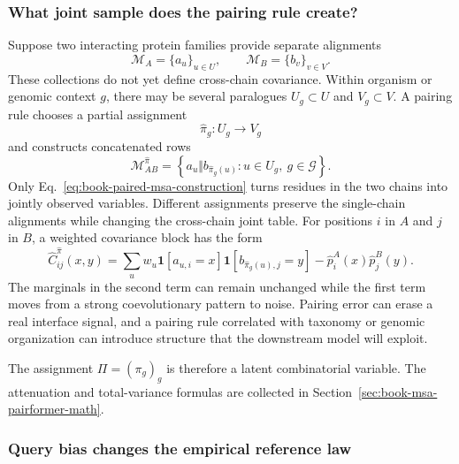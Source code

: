 \subsubsection{What joint sample does the pairing rule create?}

Suppose two interacting protein families provide separate alignments
\begin{equation}
\mathcal M_A=\{a_u\}_{u\in U},
\qquad
\mathcal M_B=\{b_v\}_{v\in V}.
\label{eq:book-two-unpaired-msas}
\end{equation}
These collections do not yet define cross-chain covariance.  Within organism or genomic context
$g$, there may be several paralogues $U_g\subset U$ and $V_g\subset V$.  A pairing rule chooses a
partial assignment
\begin{equation}
\widehat\pi_g:U_g\longrightarrow V_g
\label{eq:book-paired-msa-assignment}
\end{equation}
and constructs concatenated rows
\begin{equation}
\mathcal M_{AB}^{\widehat\pi}
=\left\{a_u\Vert b_{\widehat\pi_g(u)}:
u\in U_g,\ g\in\mathcal G\right\}.
\label{eq:book-paired-msa-construction}
\end{equation}
Only Eq.~\ref{eq:book-paired-msa-construction} turns residues in the two chains into jointly
observed variables.  Different assignments preserve the single-chain alignments while changing
the cross-chain joint table.  For positions $i$ in $A$ and $j$ in $B$, a weighted covariance block
has the form
\begin{equation}
\widehat C_{ij}^{\widehat\pi}(x,y)
=\sum_u w_u
\mathbf 1[a_{u,i}=x]
\mathbf 1[b_{\widehat\pi_g(u),j}=y]
-\widehat p_i^A(x)\widehat p_j^B(y).
\label{eq:book-cross-chain-covariance-pairing}
\end{equation}
The marginals in the second term can remain unchanged while the first term moves from a strong
coevolutionary pattern to noise.  Pairing error can erase a real interface signal, and a pairing
rule correlated with taxonomy or genomic organization can introduce structure that the downstream
model will exploit.

The assignment $\Pi=(\pi_g)_g$ is therefore a latent combinatorial variable.  The attenuation and
total-variance formulas are collected in Section~\ref{sec:book-msa-pairformer-math}.
\subsubsection{Query bias changes the empirical reference law}

